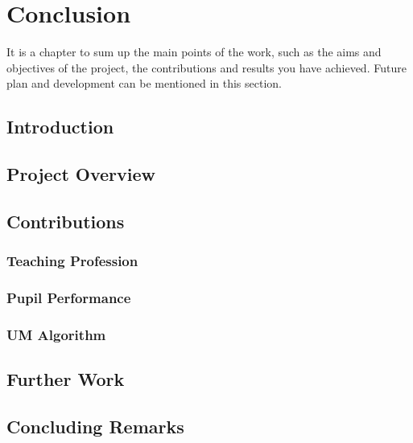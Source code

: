 \section{Conclusion}
 It is a chapter to sum up the main points of the work, such as the aims and objectives of the project, the contributions and results you have achieved.  Future plan and development can be mentioned in this section.
 \subsection{Introduction}
 
 \subsection{Project Overview}
 
 \subsection{Contributions}
 \subsubsection{Teaching Profession}
 \subsubsection{Pupil Performance}
 \subsubsection{UM Algorithm}
 
 \subsection{Further Work}
 
 \subsection{Concluding Remarks} 